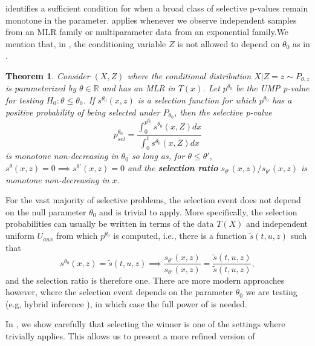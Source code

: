 \documentclass{article}
\newtheorem{theorem}{Theorem}
\newcommand{\R}{\mathbb{R}}
\begin{document}
 identifies a sufficient condition for when a broad class of selective p-values remain monotone in the parameter.  applies whenever we observe independent samples from an MLR family or multiparameter data from an exponential family.We mention that, in , the conditioning variable $Z$ is not allowed to depend on $\theta_0$ as in . 
\begin{theorem}
    \label{thm:monotone}
    Consider $(X, Z)$ where the conditional distribution $X | Z= z \sim P_{\theta, z}$ is parameterized by $\theta \in \R$ and has an MLR in $T(x)$. Let $p^{\theta_0}$ be the UMP p-value for testing $H_0: \theta \leq \theta_0$. If $s^{\theta_0}(x, z)$ is a selection function for which $p^{\theta_0}$ has a positive probability of being selected under $P_{\theta_0}$, then the selective p-value 
    \begin{equation*}
        p_{sel}^{\theta_0} = \frac{\int_0^{p^{\theta_0}} s^{\theta_0}(x, Z)  dx}{ \int_0^1 s^{\theta_0}(x, Z) dx}
    \end{equation*}
    is monotone non-decreasing in $\theta_0$ so long as, for $\theta \leq \theta'$, $s^{\theta}(x, z) = 0 \implies s^{\theta'}(x, z) = 0$ and the \textbf{selection ratio} $s_{\theta'}(x, z)/s_{\theta'}(x, z)$ is monotone non-decreasing in $x$. 
\end{theorem}

For the vast majority of selective problems, the selection event does not depend on the null parameter $\theta_0$ and  is trivial to apply. More specifically, the selection probabilities can usually be written in terms of the data $T(X)$ and independent uniform $U_{aux}$ from which $p^{\theta_0}$ is computed, i.e., there is a function $\tilde{s}(t, u, z)$ such that
\begin{equation*}
    s^{\theta_0}(x, z) =  \tilde{s}(t, u, z) \implies \frac{s_{\theta'}(x, z)}{s_{\theta'}(x, z)} = \frac{\tilde{s}(t, u, z)}{\tilde{s}(t, u, z)},
\end{equation*}
and the selection ratio is therefore one. There are more modern approaches however, where the selection event depends on the parameter $\theta_0$ we are testing (e.g, hybrid inference \cite{Andrews2023}), in which case the full power of  is needed.

In , we show carefully that selecting the winner is one of the settings where  trivially applies. This allows us to present a more refined version of 
\end{document}
